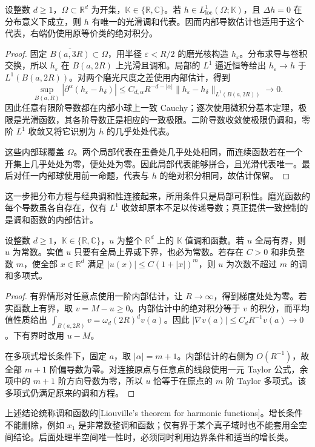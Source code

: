 \begin{proposition}[局部可积调和函数的代表]\label{b2:prop:13-harmonic-l1-representative}
设整数 \(d\geq1\)，\(\Omega\subset\mathbb R^d\) 为开集，\(\mathbb K\in\{\mathbb R,\mathbb C\}\)。若 \(h\in L^1_{\mathrm{loc}}(\Omega;\mathbb K)\)，且 \(\Delta h=0\) 在分布意义下成立，则 \(h\) 有唯一的光滑调和代表。因而内部导数估计也适用于这个代表，右端仍使用原等价类的绝对积分。
\end{proposition}
\begin{proof}
固定 \(\overline{B(a,3R)}\subset\Omega\)，用半径 \(\varepsilon<R/2\) 的磨光核构造 \(h_\varepsilon\)。分布求导与卷积交换，所以 \(h_\varepsilon\) 在 \(B(a,2R)\) 上光滑且调和。局部的 \(L^1\) 逼近恒等给出 \(h_\varepsilon\to h\) 于 \(L^1(B(a,2R))\)。对两个磨光尺度之差使用内部估计，得到
\[
 \sup_{B(a,R)}|\partial^\alpha(h_\varepsilon-h_\delta)|
 \leq C_{d,\alpha}R^{-d-|\alpha|}
       \|h_\varepsilon-h_\delta\|_{L^1(B(a,2R))}\longrightarrow0.
\]
因此任意有限阶导数都在内部小球上一致 Cauchy；逐次使用微积分基本定理，极限是光滑函数，其各阶导数正是相应的一致极限。二阶导数收敛使极限仍调和，零阶 \(L^1\) 收敛又将它识别为 \(h\) 的几乎处处代表。

这些内部球覆盖 \(\Omega\)。两个局部代表在重叠处几乎处处相同，而连续函数若在一个开集上几乎处处为零，便处处为零。因此局部代表能够拼合，且光滑代表唯一。最后对任一内部球使用前一命题，代表与 \(h\) 的绝对积分相同，故估计保留。
\end{proof}

这一步把分布方程与经典调和性连接起来，所用条件只是局部可积性。磨光函数的每个导数虽各自存在，仅有 \(L^1\) 收敛却原本不足以传递导数；真正提供一致控制的是调和函数的内部估计。

\begin{theorem}[Liouville]\label{b2:thm:13-liouville}
设整数 \(d\geq1\)，\(\mathbb K\in\{\mathbb R,\mathbb C\}\)，\(u\) 为整个 \(\mathbb R^d\) 上的 \(\mathbb K\) 值调和函数。若 \(u\) 全局有界，则 \(u\) 为常数。实值 \(u\) 只要有全局上界或下界，也必为常数。若存在 \(C>0\) 和非负整数 \(m\)，使全部 \(x\in\mathbb R^d\) 满足 \(|u(x)|\leq C(1+|x|)^m\)，则 \(u\) 为次数不超过 \(m\) 的调和多项式。
\end{theorem}
\begin{proof}
有界情形对任意点使用一阶内部估计，让 \(R\to\infty\)，得到梯度处处为零。若实函数上有界，取 \(v=M-u\geq0\)。内部估计中的绝对积分等于 \(v\) 的积分，而平均值性质给出 \(\int_{B(a,2R)}v=\omega_d(2R)^dv(a)\)。因此 \(|\nabla v(a)|\leq C_dR^{-1}v(a)\to0\)。下有界时改用 \(u-M\)。

在多项式增长条件下，固定 \(a\)，取 \(|\alpha|=m+1\)。内部估计的右侧为 \(O(R^{-1})\)，故全部 \(m+1\) 阶偏导数为零。对连接原点与任意点的线段使用一元 Taylor 公式，余项中的 \(m+1\) 阶方向导数为零，所以 \(u\) 恰等于在原点的 \(m\) 阶 Taylor 多项式。该多项式仍满足原来的调和方程。
\end{proof}

上述结论统称调和函数的[Liouville's theorem for harmonic functions]。增长条件不能删除，例如 \(x_1\) 是非常数整调和函数；仅有界于某个真子域时也不能套用全空间结论。后面处理半空间唯一性时，必须同时利用边界条件和适当的增长类。
